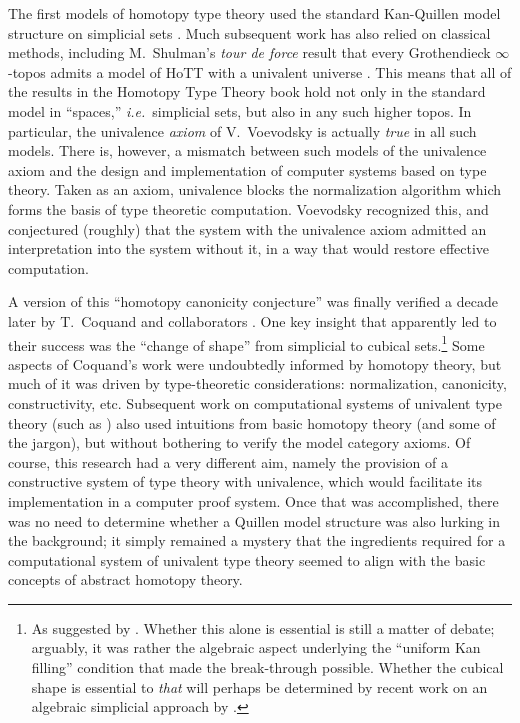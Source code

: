 \documentclass[11pt,reqno]{amsart}
\newcommand{\ie}{\emph{i.e.}}
\theoremstyle{remark}
\theoremstyle{definition}
\begin{document}
The first models of homotopy type theory used the standard Kan-Quillen model structure on simplicial sets \cite{awodey-warren:homotopy-idtype,KLV:21}. Much subsequent work has also relied on classical methods, including M.~Shulman's \emph{tour de force} result that  every Grothendieck $\infty$-topos admits a model of HoTT with a univalent universe \cite{shulman2019infty1toposes}.  This means that all of the results in the Homotopy Type Theory book \cite{hottbook} hold not only in the standard model in ``spaces,'' \ie\ simplicial sets, but also in any such higher topos.  In particular, the univalence \emph{axiom} of V.~Voevodsky is actually \emph{true} in all such models.
There is, however, a mismatch between such models of the univalence axiom and the design and implementation of computer systems based on type theory.  Taken as an axiom, univalence blocks the normalization algorithm which forms the basis of type theoretic computation. Voevodsky recognized this, and conjectured (roughly) that the system with the univalence axiom admitted an interpretation into the system without it, in a way that would restore effective computation.  

A version of this ``homotopy canonicity conjecture'' was finally verified a decade later by T.~Coquand and collaborators \cite{BCH,CCHM:2018ctt}.  One key insight that apparently led to their success was the ``change of shape'' from simplicial to cubical sets.\footnote{As suggested by \cite{BC:Kripke2015}.  Whether this alone is essential is still a matter of debate; arguably, it was rather the algebraic aspect underlying the ``uniform Kan filling'' condition that made the break-through possible.  Whether the cubical shape is essential to \emph{that} will perhaps be determined by recent work on an algebraic simplicial approach by \cite{gambino-henry}.}  
Some aspects of Coquand's work were undoubtedly informed by homotopy theory, but much of it was driven by type-theoretic considerations: normalization, canonicity, constructivity, etc.   
Subsequent work on computational systems of univalent type theory (such as \cite{orton-pitts,LOPS18,ABCHFL}) also used intuitions from basic homotopy theory (and some of the jargon), but without bothering to verify the model category axioms.  Of course, this research had a very different aim, namely the provision of a constructive system of type theory with univalence, which would facilitate its implementation in a computer proof system.  Once that was accomplished, there was no need to determine whether a Quillen model structure was also lurking in the background; it simply remained a mystery that the ingredients required for a computational system of univalent type theory seemed to align with the basic concepts of abstract homotopy theory.  
\end{document}
